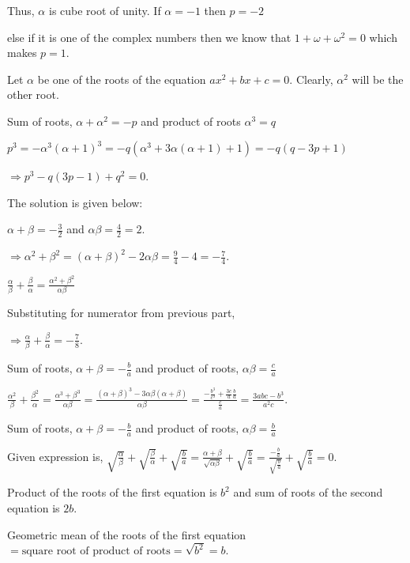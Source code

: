   Thus, $\alpha$ is cube root of unity. If $\alpha = -1$ then $p = -2$

  else if it is one of the complex numbers then we know that $1 + \omega + \omega^2 = 0$ which makes $p =
  1$.
\item Let $\alpha$ be one of the roots of the equation $ax^2 + bx + c = 0$. Clearly, $\alpha^2$ will be the other root.

  Sum of roots, $\alpha + \alpha^2 = -p$ and product of roots $\alpha^3 = q$

  $p^3 = -\alpha^3(\alpha + 1)^3 = -q(\alpha^3 + 3\alpha(\alpha + 1) + 1) = -q(q - 3p + 1)$

  $\Rightarrow p^3 - q(3p - 1) + q^2 = 0$.
\item The solution is given below:
  \startitemize[i]
  \item $\alpha + \beta = -\frac{3}{2}$ and $\alpha\beta = \frac{4}{2} = 2$.

    $\Rightarrow \alpha^2 + \beta^2 = (\alpha + \beta)^2 - 2\alpha\beta = \frac{9}{4} - 4 = -\frac{7}{4}$.
  \item $\frac{\alpha}{\beta} + \frac{\beta}{\alpha} = \frac{\alpha^2 + \beta^2}{\alpha\beta}$

    Substituting for numerator from previous part,

    $\Rightarrow \frac{\alpha}{\beta} + \frac{\beta}{\alpha} = -\frac{7}{8}$.
  \stopitemize
\item Sum of roots, $\alpha + \beta = -\frac{b}{a}$ and product of roots, $\alpha\beta = \frac{c}{a}$

  $\frac{\alpha^2}{\beta} + \frac{\beta^2}{\alpha} = \frac{\alpha^3 + \beta^3}{\alpha\beta} =
  \frac{(\alpha + \beta)^3 - 3\alpha\beta(\alpha + \beta)}{\alpha\beta} = \frac{-\frac{b^3}{c^3} +
    \frac{3c}{a}\frac{b}{a}}{\frac{c}{a}} = \frac{3abc - b^3}{a^2c}$.
\item Sum of roots, $\alpha + \beta = -\frac{b}{a}$ and product of roots, $\alpha\beta = \frac{b}{a}$

  Given expression is, $\sqrt{\frac{\alpha}{\beta}} + \sqrt{\frac{\beta}{\alpha}} + \sqrt{\frac{b}{a}} =
  \frac{\alpha + \beta}{\sqrt{\alpha\beta}} + \sqrt{\frac{b}{a}} =
  \frac{-\frac{b}{a}}{\sqrt{\frac{b}{a}}} + \sqrt{\frac{b}{a}} = 0$.
\item Product of the roots of the first equation is $ b^2$ and sum of roots of the second equation is $2b$.

  Geometric mean of the roots of the first equation $= \text{square root of product of roots} = \sqrt{b^2} =
  b$.

